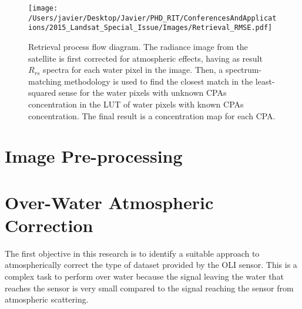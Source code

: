 \begin{figure}[htb]
  \centering
    \texttt{[image: /Users/javier/Desktop/Javier/PHD\_RIT/ConferencesAndApplications/2015\_Landsat\_Special\_Issue/Images/Retrieval\_RMSE.pdf]}
    \caption{Retrieval process flow diagram. The radiance image from the satellite is first corrected for atmospheric effects, having as result $R_{rs}$ spectra for each water pixel in the image. Then, a spectrum-matching methodology is used to find the closest match in the least-squared sense for the water pixels with unknown CPAs concentration in the LUT of water pixels with known CPAs concentration. The final result is a concentration map for each CPA.  \label{fig:retrieval} }
\end{figure}
\section{Image Pre-processing} 
\label{sec:prepro}
\section{Over-Water Atmospheric Correction} 
\label{sec:atmcorr}
The first objective in this research is to identify a suitable approach to atmospherically correct the type of dataset provided by the OLI sensor. This is a complex task to perform over water because the signal leaving the water that reaches the sensor is very small compared to the signal reaching the sensor from atmospheric scattering. 

